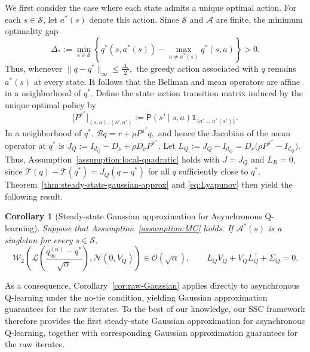 \documentclass[11pt,letterpaper]{article}
\theoremstyle{plain}
\newtheorem{corollary}{Corollary}
\theoremstyle{definition}
\theoremstyle{remark}
\newcommand{\mS}{\mathcal{S}}
\newcommand{\mA}{\mathcal{A}}
\newcommand{\mT}{\mathcal{T}}
\newcommand{\W}{\mathcal{W}}
\newcommand{\law}{\mathcal{L}}
\begin{document}
We first consider the case where each state admits a unique optimal action.
For each \(s\in\mS\), let \(a^*(s)\) denote this action. Since \(\mathcal S\) and \(\mathcal A\) are finite, the minimum optimality gap
\[
    \Delta_*
    :=
    \min_{s\in\mS}
    \left\{
        q^*(s,a^*(s))
        -
        \max_{a\neq a^*(s)}q^*(s,a)
    \right\}>0.
\]
Thus, whenever $\|q-q^*\|_\infty\leq \frac{\Delta_*}{2},$ the greedy action associated with \(q\) remains \(a^*(s)\) at every state.
It follows that the Bellman and mean operators are affine in a neighborhood
of \(q^*\). Define the state--action transition matrix induced by the unique optimal
policy by
\begin{equation*}
    \bigl[P^{\pi^*}\bigr]_{(s,a),(s',a')}
    :=
    \mathsf P(s'\mid s,a)
    \mathds{1}_{\{a'=a^*(s')\}}.
\end{equation*}
In a neighborhood of \(q^*\), $\mathcal Bq
    =
    r+\rho P^{\pi^*}q,$ and hence the Jacobian of the mean operator at $q^*$ is $J_Q
    :=
    I_{d_Q}-D_\nu
    +
    \rho D_\nu P^{\pi^*}.$ Let $L_Q
    :=
    J_Q-I_{d_Q}
    =
    D_\nu
    \bigl(\rho P^{\pi^*}-I_{d_Q}\bigr).$
Thus, Assumption~\ref{assumption:local-quadratic} holds with \(J=J_Q\) and
\(L_R=0\), since \(\mT(q)-\mT(q^*)=J_Q(q-q^*)\) for all \(q\) sufficiently
close to \(q^*\).
Theorem~\ref{thm:steady-state-gaussian-approx} and
\eqref{eq:Lyapunov} then yield the following result.
\begin{corollary}[Steady-state Gaussian approximation for Asynchronous
Q-learning]
\label{cor:q-learning-gaussian}
Suppose that Assumption~\ref{assumption:MC} holds. If \(\mA^*(s)\) is a singleton for every $s\in\mS,$ 
\begin{equation*}
    \W_2\left(
        \law\left(
            \frac{
                q_\infty^{(\alpha)}-q^*
            }{
                \sqrt{\alpha}
            }
        \right),
        \mathcal N(0,V_Q)
    \right)
    \in \mathcal O(\sqrt{\alpha}), \qquad L_QV_Q
    +
    V_QL_Q^\top
    +
    \Sigma_Q
    =
    0.
\end{equation*}
\end{corollary}
As a consequence, Corollary~\ref{cor:raw-Gaussian} applies directly to
asynchronous Q-learning under the no-tie condition, yielding Gaussian
approximation guarantees for the raw iterates. To the best of our knowledge,
our SSC framework therefore provides the first steady-state Gaussian
approximation for asynchronous Q-learning, together with corresponding
Gaussian approximation guarantees for the raw iterates.
\end{document}
